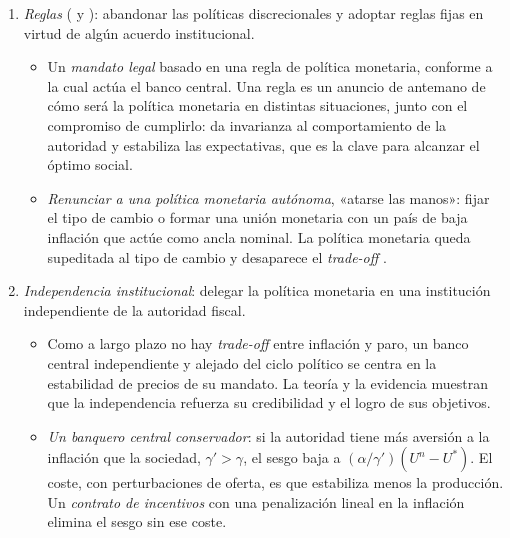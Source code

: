 \documentclass[11pt]{article}
\begin{document}
\begin{itemize}
\begin{enumerate}[label=\alph*)]
    \begin{itemize}
    \item La reputación se adquiere actuando una y otra vez conforme al óptimo social; si la autoridad se desvía, el público vuelve a esperar $\pi^D$. Es la aplicación de los teoremas populares (\emph{folk theorems}) al modelo .\footnote{Por ejemplo, , presidente de la Reserva Federal de 1979 a 1987, subió con fuerza los tipos de interés para combatir una inflación de 2~cifras: provocó una recesión, pero bajó la inflación y devolvió la confianza en el dólar\nocite{FedHistory2026Volcker}.}
    \end{itemize}
  \item \emph{Reglas} ( y ): abandonar las políticas discrecionales y adoptar reglas fijas en virtud de algún acuerdo institucional.
    \begin{itemize}
    \item Un \emph{mandato legal} basado en una regla de política monetaria, conforme a la cual actúa el banco central. Una regla es un anuncio de antemano de cómo será la política monetaria en distintas situaciones, junto con el compromiso de cumplirlo: da invarianza al comportamiento de la autoridad y estabiliza las expectativas, que es la clave para alcanzar el óptimo social.
    \item \emph{Renunciar a una política monetaria autónoma}, «atarse las manos»\nocite{GiavazziPagano1988Advantage}: fijar el tipo de cambio o formar una unión monetaria con un país de baja inflación que actúe como ancla nominal. La política monetaria queda supeditada al tipo de cambio y desaparece el \emph{trade-off} .
    \end{itemize}
  \item \emph{Independencia institucional}\nocite{Rogoff1985Optimal}: delegar la política monetaria en una institución independiente de la autoridad fiscal.
    \begin{itemize}
    \item Como a largo plazo no hay \emph{trade-off} entre inflación y paro, un banco central independiente y alejado del ciclo político se centra en la estabilidad de precios de su mandato. La teoría y la evidencia muestran que la independencia refuerza su credibilidad y el logro de sus objetivos.
    \item \emph{Un banquero central conservador}: si la autoridad tiene más aversión a la inflación que la sociedad, $\gamma'>\gamma$, el sesgo baja a $(\alpha/\gamma')(U^n-U^*)$. El coste, con perturbaciones de oferta, es que estabiliza menos la producción. Un \emph{contrato de incentivos} con una penalización lineal en la inflación elimina el sesgo sin ese coste\nocite{Walsh1995Optimal}.

\end{itemize}
\end{enumerate}
\end{itemize}
\end{document}
